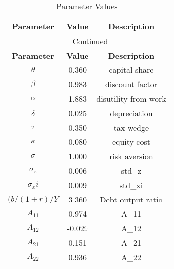 \begin{center}
\begin{longtable}{ccc}
\caption{Parameter Values}\\%
\toprule%
\multicolumn{1}{c}{\textbf{Parameter}} &
\multicolumn{1}{c}{\textbf{Value}} &
 \multicolumn{1}{c}{\textbf{Description}}\\%
\midrule%
\endfirsthead
\multicolumn{3}{c}{{\tablename} \thetable{} -- Continued}\\%
\midrule%
\multicolumn{1}{c}{\textbf{Parameter}} &
\multicolumn{1}{c}{\textbf{Value}} &
  \multicolumn{1}{c}{\textbf{Description}}\\%
\midrule%
\endhead
${\theta}$ 	 & 	 0.360 	 & 	 capital share\\
${\beta}$ 	 & 	 0.983 	 & 	 discount factor\\
${\alpha}$ 	 & 	 1.883 	 & 	 disutility from work\\
${\delta}$ 	 & 	 0.025 	 & 	 depreciation\\
${\tau}$ 	 & 	 0.350 	 & 	 tax wedge\\
${\kappa}$ 	 & 	 0.080 	 & 	 equity cost\\
${\sigma}$ 	 & 	 1.000 	 & 	 risk aversion\\
${\sigma_z}$ 	 & 	 0.006 	 & 	 std\_z\\
${\sigma_xi}$ 	 & 	 0.009 	 & 	 std\_xi\\
${(\bar b/(1+\bar r)/\bar Y}$ 	 & 	 3.360 	 & 	 Debt output ratio\\
${A_{11}}$ 	 & 	 0.974 	 & 	 A\_11\\
${A_{12}}$ 	 & 	 -0.029 	 & 	 A\_12\\
${A_{21}}$ 	 & 	 0.151 	 & 	 A\_21\\
${A_{22}}$ 	 & 	 0.936 	 & 	 A\_22\\
\bottomrule%
\end{longtable}
\end{center}
